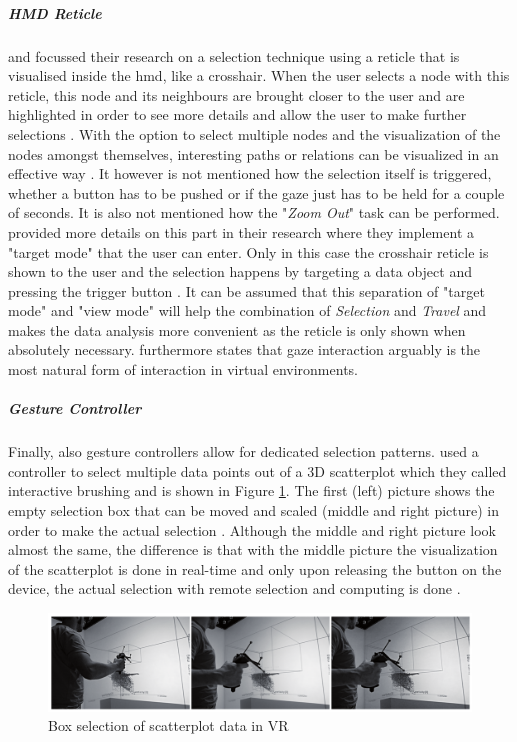 \subparagraph{HMD Reticle}

\cite{Kwon2015} and \cite{Drouhard2015} focussed their research on a selection technique using a reticle that is visualised inside the \gls{hmd}, like a crosshair. When the user selects a node with this reticle, this node and its neighbours are brought closer to the user and are highlighted in order to see more details and allow the user to make further selections \citep{Kwon2015}. With the option to select multiple nodes and the visualization of the nodes amongst themselves, interesting paths or relations can be visualized in an effective way \citep{Kwon2015}. It however is not mentioned how the selection itself is triggered, whether a button has to be pushed or if the gaze just has to be held for a couple of seconds. It is also not mentioned how the "\textit{Zoom Out}" task can be performed. \newline
\cite{Drouhard2015} provided more details on this part in their research where they implement a "target mode" that the user can enter. Only in this case the crosshair reticle is shown to the user and the selection happens by targeting a data object and pressing the trigger button \citep{Drouhard2015}. It can be assumed that this separation of "target mode" and "view mode" will help the combination of \textit{Selection} and \textit{Travel} and makes the data analysis more convenient as the reticle is only shown when absolutely necessary. \newline
\cite{Drouhard2015} furthermore states that gaze interaction arguably is the most natural form of interaction in virtual environments.


\subparagraph{Gesture Controller}

Finally, also gesture controllers allow for dedicated selection patterns. \cite{Hentschel2009} used a controller to select multiple data points out of a 3D scatterplot which they called interactive brushing and is shown in Figure \ref{fig:interactivebrushing}. The first (left) picture shows the empty selection box that can be moved and scaled (middle and right picture) in order to make the actual selection \citep{Hentschel2009}. Although the middle and right picture look almost the same, the difference is that with the middle picture the visualization of the scatterplot is done in real-time and only upon releasing the button on the device, the actual selection with remote selection and computing is done \citep{Hentschel2009} .
\begin{figure}[t]
	\begin{center}
		\includegraphics[width=14cm]{03_Figures/05_LitReview/Hentschel2009_InteractiveBrushing.png}
		\caption[Box selection of scatterplot data in VR]{Box selection of scatterplot data in VR \citep{Hentschel2009}}
		\label{fig:interactivebrushing}
	\end{center}
\end{figure}



